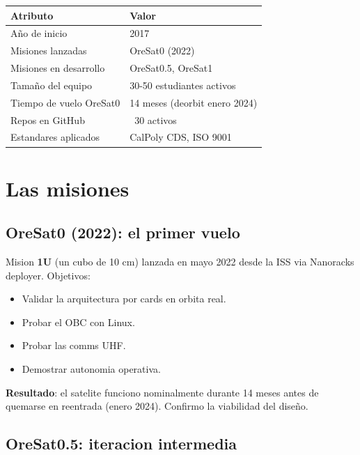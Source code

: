 \documentclass[11pt,a4paper,oneside]{report}
\begin{document}
\begin{center}
\begin{tabular}{ll}
\toprule
\textbf{Atributo} & \textbf{Valor} \\
\midrule
Año de inicio                  & 2017 \\
Misiones lanzadas              & OreSat0 (2022) \\
Misiones en desarrollo         & OreSat0.5, OreSat1 \\
Tamaño del equipo              & 30-50 estudiantes activos \\
Tiempo de vuelo OreSat0        & 14 meses (deorbit enero 2024) \\
Repos en GitHub                & ~30 activos \\
Estandares aplicados           & CalPoly CDS, ISO 9001 \\
\bottomrule
\end{tabular}
\end{center}

\chapter{Las misiones}

\section{OreSat0 (2022): el primer vuelo}

Mision \textbf{1U} (un cubo de 10 cm) lanzada en mayo 2022 desde la ISS
via Nanoracks deployer. Objetivos:

\begin{itemize}[leftmargin=2em]
  \item Validar la arquitectura por cards en orbita real.
  \item Probar el OBC con Linux.
  \item Probar las comms UHF.
  \item Demostrar autonomia operativa.
\end{itemize}

\textbf{Resultado}: el satelite funciono nominalmente durante 14 meses
antes de quemarse en reentrada (enero 2024). Confirmo la viabilidad del
diseño.

\section{OreSat0.5: iteracion intermedia}
\end{document}
